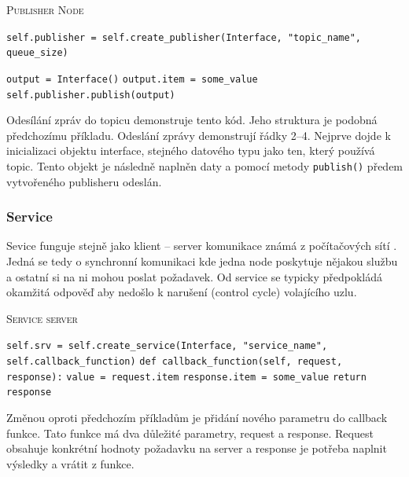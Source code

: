 \begin{algorithm}[h!]
	\label{}
	\caption{\textsc{Publisher Node}}
	
	\DontPrintSemicolon
	\SetAlgoNoLine
	\SetNlSty{}{}{:}
	\SetNlSkip{-1.1em}
	
	\BlankLine \Indp\Indpp
	\texttt{self.publisher = self.create\_publisher(Interface, "topic\_name", queue\_size)}\;
	
	\BlankLine
	\texttt{output = Interface()}\;
	\texttt{output.item = some\_value}\;
	\texttt{self.publisher.publish(output)}\;
\end{algorithm}
Odesílání zpráv do topicu demonstruje tento kód. Jeho struktura je podobná předchozímu příkladu. Odeslání zprávy demonstrují řádky 2--4. Nejprve dojde k inicializaci objektu interface, stejného datového typu jako ten, který používá topic. Tento objekt je následně naplněn daty a pomocí metody \verb|publish()| předem vytvořeného publisheru odeslán.

\subsubsection*{Service}
Sevice funguje stejně jako klient -- server komunikace známá z počítačových sítí . Jedná se tedy o synchronní komunikaci kde jedna node poskytuje nějakou službu a ostatní si na ni mohou poslat požadavek. Od service se typicky předpokládá okamžitá odpověď aby nedošlo k narušení (control cycle) volajícího uzlu. \cite{ros2_introduction}

\begin{algorithm}[h!]
	\label{}
	\caption{\textsc{Service server}}
	
	\DontPrintSemicolon
	\SetAlgoNoLine
	\SetAlgoNlRelativeSize{-1}
	\SetNlSty{}{}{:}
	\SetNlSkip{-1.1em}
	
	\BlankLine \Indp\Indpp
	
	\texttt{self.srv = self.create\_service(Interface, "service\_name", self.callback\_function)}\;
	\BlankLine
	\texttt{def callback\_function(self, request, response):}\;
	\Indp\Indp
	\texttt{value = request.item}\;
	\texttt{response.item = some\_value}\;
	\texttt{return response}\;
	
\end{algorithm}
Změnou oproti předchozím příkladům je přidání nového parametru do callback funkce. Tato funkce má dva důležité parametry, request a response. Request obsahuje konkrétní hodnoty požadavku na server a response je potřeba naplnit výsledky a vrátit z funkce.

